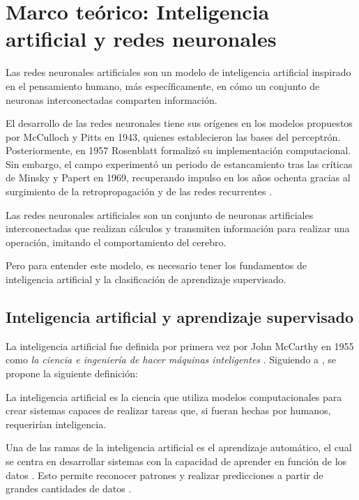 \chapter{Marco teórico: Inteligencia artificial y redes neuronales}

Las redes neuronales artificiales son un modelo de inteligencia artificial inspirado en el pensamiento humano, más específicamente, en cómo un conjunto de neuronas interconectadas comparten información. 	

El desarrollo de las redes neuronales tiene sus orígenes en los modelos propuestos por McCulloch y Pitts en 1943, quienes establecieron las bases del perceptrón. Posteriormente, en 1957 Rosenblatt formalizó su implementación computacional. Sin embargo, el campo experimentó un periodo de estancamiento tras las críticas de Minsky y Papert en 1969, recuperando impulso en los años ochenta gracias al surgimiento de la retropropagación y de las redes recurrentes \cite{ann_extra}.

Las redes neuronales artificiales son un conjunto de neuronas artificiales interconectadas que realizan cálculos y transmiten información para realizar una operación, imitando el comportamiento del cerebro.

Pero para entender este modelo, es necesario tener los fundamentos de inteligencia artificial y la clasificación de aprendizaje supervisado.

\section{Inteligencia artificial y aprendizaje supervisado}

La inteligencia artificial fue definida por primera vez por John McCarthy en 1955 como \textit{la ciencia e ingeniería de hacer máquinas inteligentes} \cite{ai_def_1}. Siguiendo a \cite{ai_def_1, ai_def_2, ai_def_3}, se propone la siguiente definición:

\begin{definition}
	
	La inteligencia artificial es la ciencia que utiliza modelos computacionales para crear sistemas capaces de realizar tareas que, si fueran hechas por humanos, requerirían inteligencia.
	
\end{definition}

Una de las ramas de la inteligencia artificial es el aprendizaje automático, el cual se centra en desarrollar sistemas con la capacidad de aprender en función de los datos \cite{ml_def_1}. Esto permite reconocer patrones y realizar predicciones a partir de grandes cantidades de datos \cite{GoogleCloud2025}.

